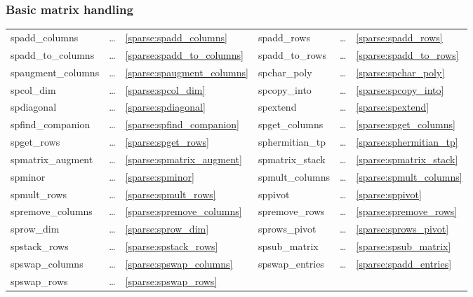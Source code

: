 \subsubsection{Basic matrix handling}
\begin{center}
\begin{tabular}{l l l l l l}
spadd\_columns     & \ldots & \ref{sparse:spadd_columns}  &
spadd\_rows        & \ldots & \ref{sparse:spadd_rows}  \\
spadd\_to\_columns & \ldots & \ref{sparse:spadd_to_columns}  &
spadd\_to\_rows    & \ldots & \ref{sparse:spadd_to_rows}  \\
spaugment\_columns & \ldots & \ref{sparse:spaugment_columns}  &
spchar\_poly       & \ldots & \ref{sparse:spchar_poly}  \\
spcol\_dim         & \ldots & \ref{sparse:spcol_dim}  &
spcopy\_into       & \ldots & \ref{sparse:spcopy_into} \\
spdiagonal         & \ldots & \ref{sparse:spdiagonal} &
spextend           & \ldots & \ref{sparse:spextend} \\
spfind\_companion  & \ldots & \ref{sparse:spfind_companion}  &
spget\_columns     & \ldots & \ref{sparse:spget_columns} \\
spget\_rows        & \ldots & \ref{sparse:spget_rows} &
sphermitian\_tp    & \ldots & \ref{sparse:sphermitian_tp} \\
spmatrix\_augment  & \ldots & \ref{sparse:spmatrix_augment} &
spmatrix\_stack    & \ldots & \ref{sparse:spmatrix_stack} \\
spminor            & \ldots & \ref{sparse:spminor} &
spmult\_columns    & \ldots & \ref{sparse:spmult_columns} \\
spmult\_rows       & \ldots & \ref{sparse:spmult_rows} &
sppivot            & \ldots & \ref{sparse:sppivot} \\
spremove\_columns  & \ldots & \ref{sparse:spremove_columns} &
spremove\_rows     & \ldots & \ref{sparse:spremove_rows} \\
sprow\_dim         & \ldots & \ref{sparse:sprow_dim} &
sprows\_pivot      & \ldots & \ref{sparse:sprows_pivot} \\
spstack\_rows      & \ldots & \ref{sparse:spstack_rows} &
spsub\_matrix      & \ldots & \ref{sparse:spsub_matrix} \\
spswap\_columns    & \ldots & \ref{sparse:spswap_columns} &
spswap\_entries    & \ldots & \ref{sparse:spadd_entries} \\
spswap\_rows       & \ldots & \ref{sparse:spswap_rows} &
\end{tabular}
\end{center}

